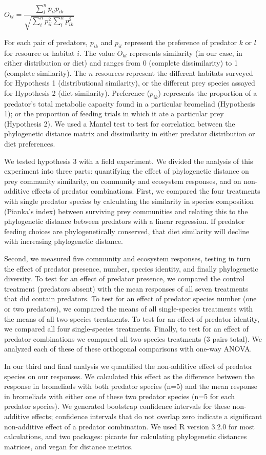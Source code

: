 \(O_{kl}=\dfrac{\sum_i^n{p_{il} p_{ik}}}{\sqrt{\sum_i^n{p_{il}^2} \sum_i^n{p_{ik}^2}}}\)

For each pair of predators, \(p_{ik}\) and \(p_{il}\) represent the
preference of predator \(k\) or \(l\) for resource or habitat \(i\). The
value \(O_{kl}\) represents similarity (in our case, in either
distribution or diet) and ranges from 0 (complete dissimilarity) to 1
(complete similarity). The \(n\) resources represent the different
habitats surveyed for Hypothesis 1 (distributional similarity), or the
different prey species assayed for Hypothesis 2 (diet similarity).
Preference (\(p_{ik}\)) represents the proportion of a predator's total
metabolic capacity found in a particular bromeliad (Hypothesis 1); or
the proportion of feeding trials in which it ate a particular prey
(Hypothesis 2). We used a Mantel test to test for correlation between the phylogenetic distance matrix
and dissimilarity in either predator distribution or diet preferences.

We tested hypothesis 3 with a field experiment. We divided the analysis of this experiment into three parts: quantifying
the effect of phylogenetic distance on prey community similarity, on
community and ecosystem responses, and on non-additive effects of
predator combinations. First, we compared the four treatments with
single predator species by calculating the similarity in species
composition (Pianka's index) between surviving prey communities and
relating this to the phylogenetic distance between predators with a
linear regression. If predator feeding choices are phylogenetically
conserved, that diet similarity will decline with increasing
phylogenetic distance.

Second, we measured five community and ecosystem responses, testing in
turn the effect of predator presence, number, species identity, and
finally phylogenetic diversity. To test for an effect of predator
presence, we compared the control treatment (predators absent) with the
mean responses of all seven treatments that did contain predators. To
test for an effect of predator species number (one or two predators), we
compared the means of all single-species treatments with the means of
all two-species treatments. To test for an effect of predator identity,
we compared all four single-species treatments. Finally, to test for an
effect of predator combinations we compared all two-species treatments
(3 pairs total). We analyzed each of these of these orthogonal
comparisons with one-way ANOVA.

In our third and final analysis we quantified the non-additive effect of
predator species on our responses. We calculated this effect as the
difference between the response in bromeliads with both predator species
(n=5) and the mean response in bromeliads with either one of these two
predator species (n=5 for each predator species). We generated bootstrap
confidence intervals for these non-additive effects; confidence
intervals that do not overlap zero indicate a significant non-additive
effect of a predator combination. We used R version 3.2.0 \citep{rcore}
for most calculations, and two packages: picante \citep{picante} for
calculating phylogenetic distances matrices, and vegan \citep{vegan} for
distance metrics.

